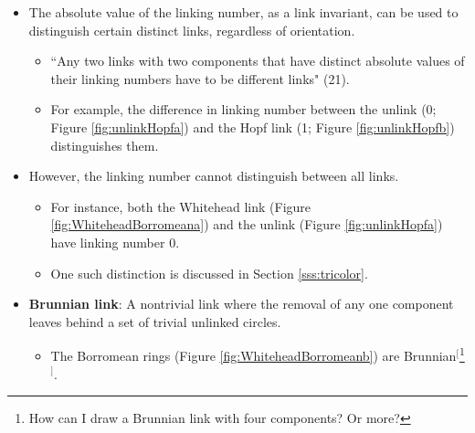 \documentclass[titlepage]{article}
\numberwithin{figure}{section}
\numberwithin{table}{section}
\numberwithin{equation}{section}
\newcommand{\dq}[2]{``#1" (#2).}
\begin{document}
\begin{itemize}
\begin{itemize}
    \end{itemize}
    \item The absolute value of the linking number, as a link invariant, can be used to distinguish certain distinct links, regardless of orientation.
    \begin{itemize}
        \item \dq{Any two links with two components that have distinct absolute values of their linking numbers have to be different links}{21}
        \item For example, the difference in linking number between the unlink (0; Figure \ref{fig:unlinkHopfa}) and the Hopf link (1; Figure \ref{fig:unlinkHopfb}) distinguishes them.
    \end{itemize}
    \item However, the linking number cannot distinguish between all links.
    \begin{itemize}
        \item For instance, both the Whitehead link (Figure \ref{fig:WhiteheadBorromeana}) and the unlink (Figure \ref{fig:unlinkHopfa}) have linking number 0.
        \item One such distinction is discussed in Section \ref{sss:tricolor}.
    \end{itemize}
    \item \textbf{Brunnian link}: A nontrivial link where the removal of any one component leaves behind a set of trivial unlinked circles.
    \begin{itemize}
        \item The Borromean rings (Figure \ref{fig:WhiteheadBorromeanb}) are Brunnian$^[$\footnote{How can I draw a Brunnian link with four components? Or more?}$^]$.
    \end{itemize}
\end{itemize}
\end{document}
